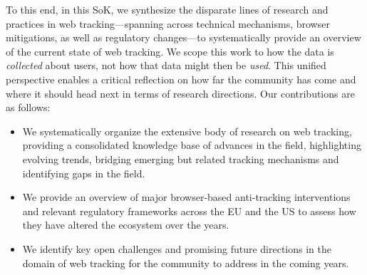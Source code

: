 To this end, in this SoK, we synthesize the disparate lines of research and practices in web tracking---spanning across technical mechanisms, browser mitigations, as well as regulatory changes---to systematically provide an overview of the current state of web tracking. 
%
We scope this work to how the data is \textit{collected} about users, not how that data might then be \textit{used}. 
%
This unified perspective enables a critical reflection on how far the community has come and where it should head next in terms of research directions.
%
Our contributions are as follows:
\vspace{-1mm}

\begin{itemize}
    \item We systematically organize the extensive body of research on web tracking, providing a consolidated knowledge base of advances in the field, highlighting evolving trends, bridging emerging but related tracking mechanisms and identifying gaps in the field. %

    \item We provide an overview of major browser-based anti-tracking interventions and relevant regulatory frameworks across the EU and the US to assess how they have altered the ecosystem over the years.

    \item We identify key open challenges and promising future directions in the domain of web tracking for the community to address in the coming years.
\end{itemize}
